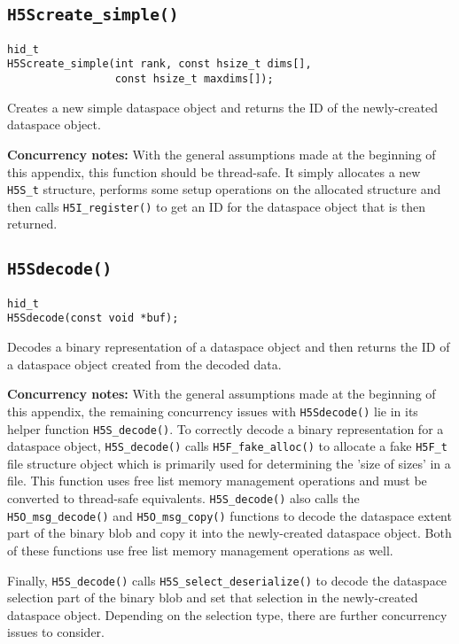 \documentclass[../HDF5_RFC.tex]{subfiles}
\begin{document}
\subsection{\texttt{H5Screate\_simple()}}
\label{apdx:h5s_func_h5screate_simple}

\begin{verbatim}
hid_t
H5Screate_simple(int rank, const hsize_t dims[],
                 const hsize_t maxdims[]);
\end{verbatim}

Creates a new simple dataspace object and returns the ID of the newly-created dataspace
object.

\textbf{Concurrency notes:} With the general assumptions made at the beginning of this
appendix, this function should be thread-safe. It simply allocates a new \texttt{H5S\_t}
structure, performs some setup operations on the allocated structure and then calls
\texttt{H5I\_register()} to get an ID for the dataspace object that is then returned.

\subsection{\texttt{H5Sdecode()}}
\label{apdx:h5s_func_h5sdecode}

\begin{verbatim}
hid_t
H5Sdecode(const void *buf);
\end{verbatim}

Decodes a binary representation of a dataspace object and then returns the ID of a
dataspace object created from the decoded data.

\textbf{Concurrency notes:} With the general assumptions made at the beginning of this
appendix, the remaining concurrency issues with \texttt{H5Sdecode()} lie in its helper
function \texttt{H5S\_decode()}. To correctly decode a binary representation for a dataspace
object, \texttt{H5S\_decode()} calls \texttt{H5F\_fake\_alloc()} to allocate a fake
\texttt{H5F\_t} file structure object which is primarily used for determining the 'size of
sizes' in a file. This function uses free list memory management operations and must be converted
to thread-safe equivalents. \texttt{H5S\_decode()} also calls the \texttt{H5O\_msg\_decode()}
and \texttt{H5O\_msg\_copy()} functions to decode the dataspace extent part of the binary blob
and copy it into the newly-created dataspace object. Both of these functions use free list
memory management operations as well.

Finally, \texttt{H5S\_decode()} calls \texttt{H5S\_select\_deserialize()} to decode the dataspace
selection part of the binary blob and set that selection in the newly-created dataspace object.
Depending on the selection type, there are further concurrency issues to consider.
\end{document}
